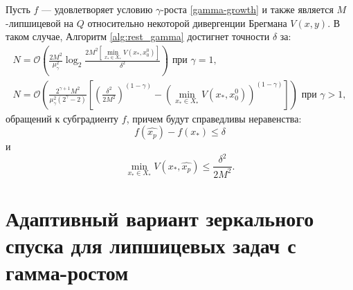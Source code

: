     \begin{remark}
        Пусть $f$ --- удовлетворяет условию $\gamma$-роста \eqref{gamma-growth} и также является $M$-липшицевой на $Q$ относительно некоторой дивергенции Брегмана $V(x, y)$. В таком случае, Алгоритм \ref{alg:rest_gamma} достигнет точности $\delta$ за:
        \begin{equation}
            \begin{aligned}
               N = \mathcal{O}\left(\frac{2 M^2}{\mu_{\gamma}^2} \log_2{\frac{2 M^2 \left[\min\limits_{x_* \in X_*}{V(x_*, x_0^0)}\right]}{\delta^2}}\right) \text{ при } \gamma = 1, \\
               N = \mathcal{O}\left(\frac{2^{\gamma + 1} M^2}{\mu_{\gamma}^2 (2^{\gamma} - 2)} \left[\left(\frac{\delta^2}{2 M^2}\right)^{(1 - \gamma)} - \left(\min\limits_{x_* \in X_*}{V(x_*, x_0^0)}\right)^{(1 - \gamma)}\right]\right) \text{ при } \gamma > 1,
            \end{aligned}
        \end{equation}
        обращений к субградиенту $f$, причем будут справедливы неравенства:
        \begin{equation}
           f(\widehat{x_p}) - f(x_*)  \leq \delta 
        \end{equation}
        и
        \begin{equation}
           \min\limits_{x_* \in X_*}{V(x_*, \widehat{x_p})} \leq \frac{\delta^2}{2 M^2}.
        \end{equation}
    \end{remark}

\section{Адаптивный вариант зеркального спуска для липшицевых задач с гамма-ростом}\label{sec:ch3/sect4}

